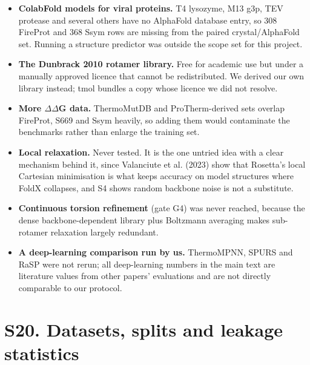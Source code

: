 \documentclass[11pt,a4paper]{article}
\begin{document}
\begin{itemize}
\item \textbf{ColabFold models for viral proteins.} T4 lysozyme, M13 g3p, TEV protease and several others have no
  AlphaFold database entry, so 308 FireProt and 368 Ssym rows are missing from the paired crystal/AlphaFold set.
  Running a structure predictor was outside the scope set for this project.
\item \textbf{The Dunbrack 2010 rotamer library.} Free for academic use but under a manually approved licence that cannot
  be redistributed. We derived our own library instead; tmol bundles a copy whose licence we did not resolve.
\item \textbf{More $\Delta$$\Delta$G data.} ThermoMutDB and ProTherm-derived sets overlap FireProt, S669 and Ssym heavily, so adding
  them would contaminate the benchmarks rather than enlarge the training set.
\item \textbf{Local relaxation.} Never tested. It is the one untried idea with a clear mechanism behind it, since
  Valanciute et al. (2023) show that Rosetta's local Cartesian minimisation is what keeps accuracy on model
  structures where FoldX collapses, and S4 shows random backbone noise is not a substitute.
\item \textbf{Continuous torsion refinement} (gate G4) was never reached, because the dense backbone-dependent library
  plus Boltzmann averaging makes sub-rotamer relaxation largely redundant.
\item \textbf{A deep-learning comparison run by us.} ThermoMPNN, SPURS and RaSP were not rerun; all deep-learning numbers
  in the main text are literature values from other papers' evaluations and are not directly comparable to our
  protocol.
\end{itemize}



\section{S20. Datasets, splits and leakage statistics}
\end{document}
